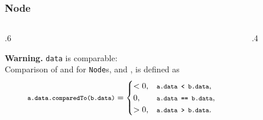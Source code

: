 \documentclass[10pt]{beamer}
\begin{document}







\begin{frame}[t]\frametitle{Node}
	\begin{columns}[T] %
	\begin{column}{.6\linewidth} %
		{\tiny 
			
		} %
		
		{\footnotesize 
		\textbf{Warning.}
		\texttt{data} is comparable:\\
		Comparison of   and  
		for \texttt{Node}s,   and , is defined as
		\[
			\hCode{a.data.comparedTo(b.data)} = 
			\begin{cases}
				< 0, & \hCode{a.data < b.data}, \\
				0, & \hCode{a.data == b.data},\\
				> 0, & \hCode{a.data > b.data}.
			\end{cases}
		\]
		} %
	\end{column} %
	\begin{column}{.4\linewidth} %
		{\footnotesize 
%		
		
		} %
	\end{column} %
	\end{columns} %
	
\end{frame}




\end{document}
